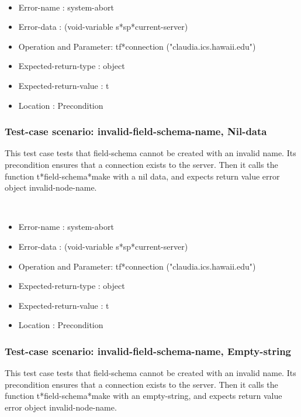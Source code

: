 \
\begin {itemize}
\item 	Error-name             : system-abort
\item Error-data             : (void-variable s*sp*current-server)
\item Operation and Parameter: tf*connection ("claudia.ics.hawaii.edu")
\item Expected-return-type   : object
\item Expected-return-value  : t
\item Location               : Precondition



\end {itemize}
\subsubsection {Test-case scenario: invalid-field-schema-name, Nil-data}


This test case tests that field-schema cannot be created with an invalid name.
Its precondition ensures that a connection exists to the server.
Then it calls the function t*field-schema*make  with a nil data, and expects return value error object invalid-node-name.



\
\begin {itemize}
\item 	Error-name             : system-abort
\item Error-data             : (void-variable s*sp*current-server)
\item Operation and Parameter: tf*connection ("claudia.ics.hawaii.edu")
\item Expected-return-type   : object
\item Expected-return-value  : t
\item Location               : Precondition



\end {itemize}
\subsubsection {Test-case scenario: invalid-field-schema-name, Empty-string}


This test case tests that field-schema cannot be created with an invalid name.
Its precondition ensures that a connection exists to the server.
Then it calls the function t*field-schema*make  with an empty-string, and expects return value error object invalid-node-name.



